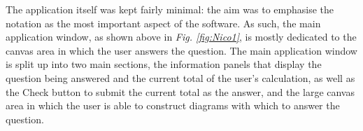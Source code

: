 \documentclass[12pt,twoside,notitlepage,xetex]{report}
\begin{document}
The application itself was kept fairly minimal: the aim was to emphasise the
notation as the most important aspect of the software.  As such, the main
application window, as shown above in \emph{Fig. \ref{fig:Nico1}}, is mostly dedicated to
the canvas area in which the user answers the question.  The main application
window is split up into two main sections, the information panels that display the question being answered and the current
total of the user's calculation, as well as the {\sfapp Check} button to submit
the current total as the answer, and the large canvas
area in which the user is able to construct diagrams with which to answer the
question.

\end{document}
